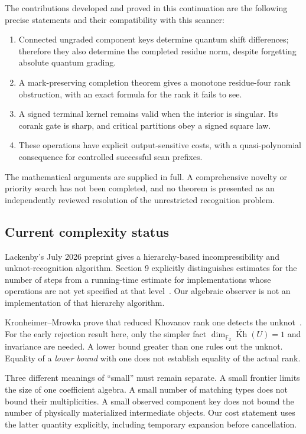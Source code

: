 \documentclass[11pt]{article}
\theoremstyle{definition}
\theoremstyle{remark}
\newcommand{\F}{{\mathbb F_2}}
\newcommand{\Kh}{\operatorname{Kh}}
\begin{document}
The contributions developed and proved in this continuation are the
following precise statements and their compatibility with this scanner:
\begin{enumerate}
\item Connected ungraded component keys determine quantum shift differences;
therefore they also determine the completed residue norm, despite forgetting
absolute quantum grading.
\item A mark-preserving completion theorem gives a monotone residue-four
rank obstruction, with an exact formula for the rank it fails to see.
\item A signed terminal kernel remains valid when the interior is singular.
Its corank gate is sharp, and critical partitions obey a signed square law.
\item These operations have explicit output-sensitive costs, with a
quasi-polynomial consequence for controlled successful scan prefixes.
\end{enumerate}
The mathematical arguments are supplied in full. A comprehensive novelty or
priority search has not been completed, and no theorem is presented as an
independently reviewed resolution of the unrestricted recognition problem.

\subsection{Current complexity status}
Lackenby's July 2026 preprint gives a hierarchy-based incompressibility and
unknot-recognition algorithm. Section 9 explicitly distinguishes estimates
for the number of steps from a running-time estimate for implementations
whose operations are not yet specified at that level~\cite[Section 9]{lackenby}.
Our algebraic observer is not an implementation of that hierarchy algorithm.

Kronheimer--Mrowka prove that reduced Khovanov rank one detects the
unknot~\cite{km}. For the early rejection result here, only the simpler fact
$\dim_{\F}\widetilde{\Kh}(U)=1$ and invariance are needed. A lower bound greater
than one rules out the unknot. Equality of a \emph{lower bound} with one does
not establish equality of the actual rank.

Three different meanings of ``small'' must remain separate. A small frontier
limits the size of one coefficient algebra. A small number of matching types
does not bound their multiplicities. A small observed component key does not
bound the number of physically materialized intermediate objects. Our cost
statement uses the latter quantity explicitly, including temporary expansion
before cancellation.
\end{document}
